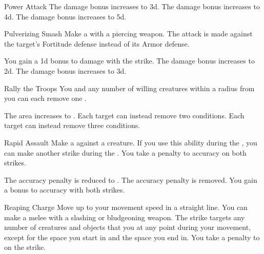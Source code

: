 {\begin{apability}{Power Attack}
                \rankline
                 The damage bonus increases to \plus3d.
                 The damage bonus increases to \plus4d.
                 The damage bonus increases to \plus5d.
            \end{apability}

            \begin{apability}{Pulverizing Smash}
                Make a  with a piercing weapon.
                The attack is made against the target's Fortitude defense instead of its Armor defense.

                \rankline
                 You gain a \plus1d bonus to damage with the strike.
                 The damage bonus increases to \plus2d.
                 The damage bonus increases to \plus3d.
            \end{apability}

            \begin{apability}{Rally the Troops}
                You and any number of willing creatures within a \areamed radius from you can each remove one .

                \rankline
                 The area increases to \arealarge.
                 Each target can instead remove two conditions.
                 Each target can instead remove three conditions.
            \end{apability}

            \begin{apability}{Rapid Assault}
                Make a  against a creature.
                If you use this ability during the , you can make another strike during the .
                You take a  penalty to accuracy on both strikes.

                \rankline
                 The accuracy penalty is reduced to .
                 The accuracy penalty is removed.
                 You gain a  bonus to accuracy with both strikes.
            \end{apability}

            \begin{apability}{Reaping Charge}
                Move up to your movement speed in a straight line.
                You can make a melee  with a slashing or bludgeoning weapon.
                The strike targets any number of creatures and objects that you  at any point during your movement, except for the space you start in and the space you end in.
                You take a  penalty to  on the strike.


\end{apability}}
